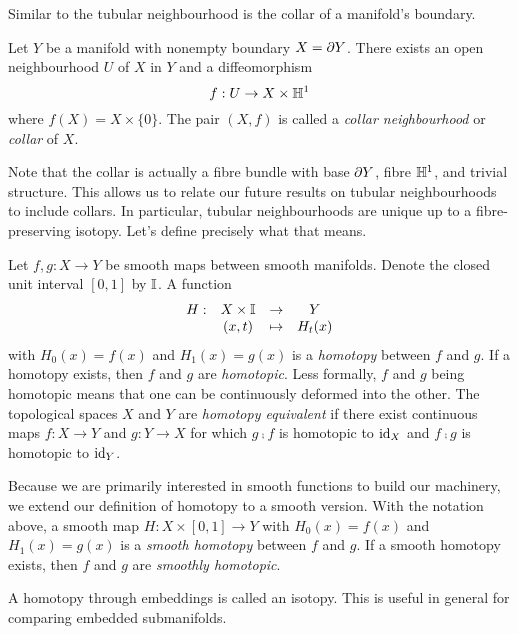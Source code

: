 Similar to the tubular neighbourhood is the collar of a manifold's boundary.

\begin{prop}[Collars]
	\label{defthm:collar}
	Let $Y$ be a manifold with nonempty boundary $X = \partial Y$.
	There exists an open neighbourhood $U$ of $X$ in $Y$ and a diffeomorphism
	\[
	f: U \to X\times\mathbb{H}^1
	\]
	where $f(X)=X\times \{0\}$.
	The pair $(X,f)$ is called a \emph{collar neighbourhood} or \emph{collar} of $X$.	
\end{prop}

Note that the collar is actually a fibre bundle with base $\partial Y$, fibre $\mathbb{H}^1$, and trivial structure.
This allows us to relate our future results on tubular neighbourhoods to include collars.
In particular, tubular neighbourhoods are unique up to a fibre-preserving isotopy.
Let's define precisely what that means.

\begin{defn}[Homotopy]
	\label{def:homotopy}
	Let $f,g:X\to Y$ be smooth maps between smooth manifolds.
	Denote the closed unit interval $[0,1]$ by $\mathbb{I}$.
	A function 
	\[
		\begin{array}{cccc}
			H: & X\times \mathbb{I} & \to & Y \\
			   & (x,t)	& \mapsto & H_t(x)
		\end{array}
	\]
	with $H_0(x)=f(x)$ and $H_1(x)=g(x)$ is a \emph{homotopy} between $f$ and $g$.
	If a homotopy exists, then $f$ and $g$ are \emph{homotopic}.
	Less formally, $f$ and $g$ being homotopic means that one can be continuously deformed into the other.
	The topological spaces $X$ and $Y$ are \emph{homotopy equivalent} if there exist continuous maps $f:X\to Y$ and $g:Y\to X$ for which $g\comp f$ is homotopic to $\textrm{id}_{X}$ and $f\comp g$ is homotopic to $\textrm{id}_{Y}$.
	
	Because we are primarily interested in smooth functions to build our machinery, we extend our definition of homotopy to a smooth version.
	With the notation above, a smooth map $H:X\times[0,1]\to Y$ with $H_0(x)=f(x)$ and $H_1(x)=g(x)$ is a \emph{smooth homotopy} between $f$ and $g$.
	If a smooth homotopy exists, then $f$ and $g$ are \emph{smoothly homotopic}.
\end{defn}

A homotopy through embeddings is called an isotopy.
This is useful in general for comparing embedded submanifolds.


